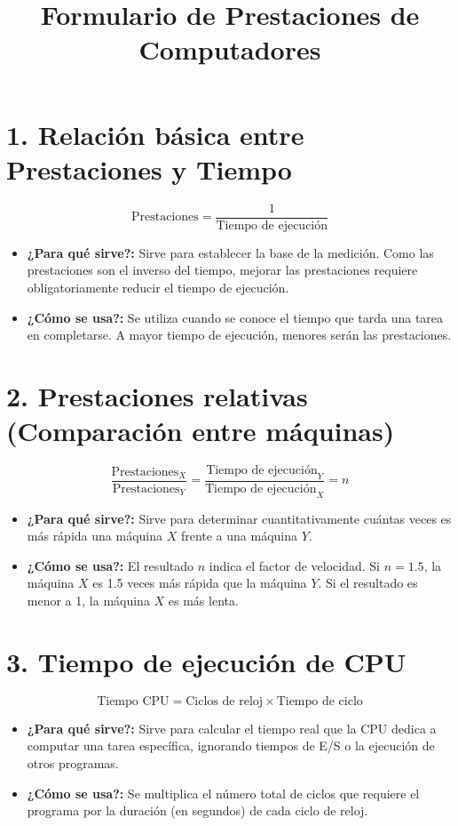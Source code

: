 \documentclass[12pt]{article}
\title{\textbf{Formulario de Prestaciones de Computadores}}
\author{}
\date{}
\begin{document}
\maketitle

\section*{1. Relación básica entre Prestaciones y Tiempo}
\begin{tcolorbox}[cajaformal]
\[ \text{Prestaciones} = \frac{1}{\text{Tiempo de ejecución}} \]
\end{tcolorbox}
\begin{itemize}
    \item \textbf{¿Para qué sirve?:} Sirve para establecer la base de la medición. Como las prestaciones son el inverso del tiempo, mejorar las prestaciones requiere obligatoriamente reducir el tiempo de ejecución.
    \item \textbf{¿Cómo se usa?:} Se utiliza cuando se conoce el tiempo que tarda una tarea en completarse. A mayor tiempo de ejecución, menores serán las prestaciones.
\end{itemize}

\section*{2. Prestaciones relativas (Comparación entre máquinas)}
\begin{tcolorbox}[cajaformal]
\[ \frac{\text{Prestaciones}_X}{\text{Prestaciones}_Y} = \frac{\text{Tiempo de ejecución}_Y}{\text{Tiempo de ejecución}_X} = n \]
\end{tcolorbox}
\begin{itemize}
    \item \textbf{¿Para qué sirve?:} Sirve para determinar cuantitativamente cuántas veces es más rápida una máquina $X$ frente a una máquina $Y$.
    \item \textbf{¿Cómo se usa?:} El resultado $n$ indica el factor de velocidad. Si $n = 1.5$, la máquina $X$ es 1.5 veces más rápida que la máquina $Y$. Si el resultado es menor a 1, la máquina $X$ es más lenta.
\end{itemize}

\section*{3. Tiempo de ejecución de CPU}
\begin{tcolorbox}[cajaformal]
\[ \text{Tiempo CPU} = \text{Ciclos de reloj} \times \text{Tiempo de ciclo} \]
\end{tcolorbox}
\begin{itemize}
    \item \textbf{¿Para qué sirve?:} Sirve para calcular el tiempo real que la CPU dedica a computar una tarea específica, ignorando tiempos de E/S o la ejecución de otros programas.
    \item \textbf{¿Cómo se usa?:} Se multiplica el número total de ciclos que requiere el programa por la duración (en segundos) de cada ciclo de reloj.
\end{itemize}
\end{document}
